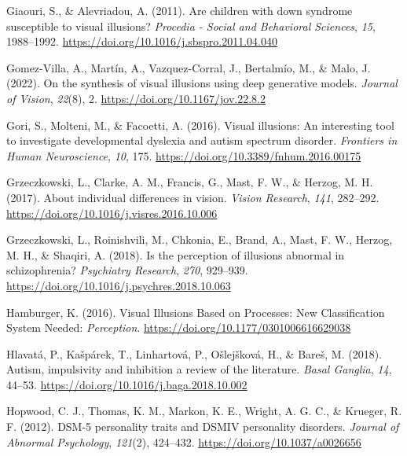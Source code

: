 \documentclass[
  man,floatsintext]{apa6}
\newlength{\cslhangindent}
\newlength{\cslentryspacingunit} %
\newenvironment{CSLReferences}[2] %
 {%
  \setlength{\parindent}{0pt}
  \ifodd #1
  \let\oldpar\par
  \def\par{\hangindent=\cslhangindent\oldpar}
  \fi
  \setlength{\parskip}{#2\cslentryspacingunit}
 }%
 {}
\begin{document}
\begin{CSLReferences}{1}{0}
\leavevmode{}%
Giaouri, S., \& Alevriadou, A. (2011). Are children with down syndrome susceptible to visual illusions? \emph{Procedia - Social and Behavioral Sciences}, \emph{15}, 1988--1992. \url{https://doi.org/10.1016/j.sbspro.2011.04.040}

\leavevmode{}%
Gomez-Villa, A., Martín, A., Vazquez-Corral, J., Bertalmío, M., \& Malo, J. (2022). On the synthesis of visual illusions using deep generative models. \emph{Journal of Vision}, \emph{22}(8), 2. \url{https://doi.org/10.1167/jov.22.8.2}

\leavevmode{}%
Gori, S., Molteni, M., \& Facoetti, A. (2016). Visual illusions: An interesting tool to investigate developmental dyslexia and autism spectrum disorder. \emph{Frontiers in Human Neuroscience}, \emph{10}, 175. \url{https://doi.org/10.3389/fnhum.2016.00175}

\leavevmode{}%
Grzeczkowski, L., Clarke, A. M., Francis, G., Mast, F. W., \& Herzog, M. H. (2017). About individual differences in vision. \emph{Vision Research}, \emph{141}, 282--292. \url{https://doi.org/10.1016/j.visres.2016.10.006}

\leavevmode{}%
Grzeczkowski, L., Roinishvili, M., Chkonia, E., Brand, A., Mast, F. W., Herzog, M. H., \& Shaqiri, A. (2018). Is the perception of illusions abnormal in schizophrenia? \emph{Psychiatry Research}, \emph{270}, 929--939. \url{https://doi.org/10.1016/j.psychres.2018.10.063}

\leavevmode{}%
Hamburger, K. (2016). Visual Illusions Based on Processes: New Classification System Needed: \emph{Perception}. \url{https://doi.org/10.1177/0301006616629038}

\leavevmode{}%
Hlavatá, P., Kašpárek, T., Linhartová, P., Ošlejšková, H., \& Bareš, M. (2018). Autism, impulsivity and inhibition a review of the literature. \emph{Basal Ganglia}, \emph{14}, 44--53. \url{https://doi.org/10.1016/j.baga.2018.10.002}

\leavevmode{}%
Hopwood, C. J., Thomas, K. M., Markon, K. E., Wright, A. G. C., \& Krueger, R. F. (2012). DSM-5 personality traits and DSM{\textendash}IV personality disorders. \emph{Journal of Abnormal Psychology}, \emph{121}(2), 424--432. \url{https://doi.org/10.1037/a0026656}


\end{CSLReferences}
\end{document}
